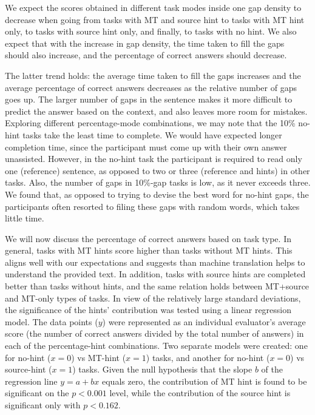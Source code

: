 \documentclass[11pt]{article}
\begin{document}
We expect the scores obtained in different task modes inside one gap density to decrease when going from tasks with MT and source hint to tasks with MT hint only, to tasks with  source hint only, and finally, to tasks with no hint. We also expect that with the increase in gap density, the time taken to fill the gaps should also increase, and the percentage of correct answers should decrease. 

The latter trend holds: the average time taken to fill the gaps increases and the average percentage of correct answers decreases as the relative number of gaps goes up. The larger number of gaps in the sentence makes it more
difficult to predict the answer based on the context, and also leaves more room for
mistakes. Exploring different percentage-mode combinations, we may note that the 10\% no-hint tasks take the least time to complete. We would have expected longer completion time, since the participant must come up with their own answer unassisted. However, in the no-hint task the participant is required to read only one (reference) sentence, as opposed to two or three (reference and hints) in other tasks. Also, the number of gaps in 10\%-gap tasks is low, as it never exceeds three. We found that, as opposed to trying to devise the best word for no-hint gaps, the participants often resorted to filing these gaps with random words, which takes little time.

We will now discuss the percentage of correct answers based on task type. In general, tasks with MT hints score higher than tasks without MT hints. This aligns well with our expectations and suggests than machine translation helps to understand the provided text. In addition, tasks with source hints are completed better than tasks without hints, and the same relation holds between MT+source and MT-only types of tasks. In view of the relatively large standard deviations, the significance of the hints' contribution was tested using a linear regression model. The data points (\(y\)) were represented as an individual evaluator's average score (the number of correct answers divided by the total number of answers) in each of the percentage-hint combinations. Two separate models were created: one for no-hint (\(x=0\)) vs MT-hint (\(x=1\)) tasks, and another for no-hint (\(x=0\)) vs source-hint (\(x=1\)) tasks. Given the null hypothesis that the slope \(b\) of the regression line \(y=a+bx\) equals zero, the contribution of MT hint is found to be significant on the \(p<0.001\) level, while the contribution of the source hint is significant only with \(p<0.162\).
\end{document}
